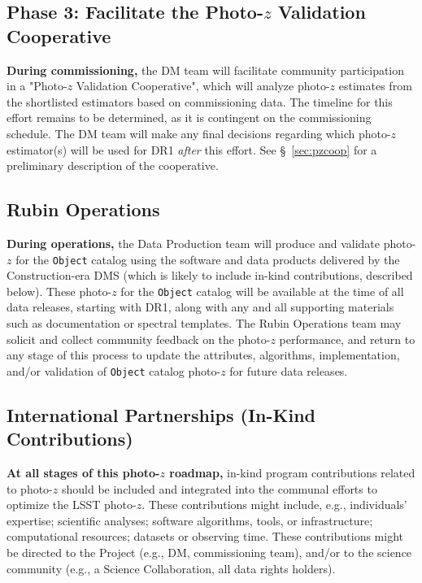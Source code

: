 \documentclass[DM,lsstdraft,toc]{lsstdoc}
\begin{document}
\subsection{Phase 3: Facilitate the Photo-$z$ Validation Cooperative}\label{ssec:time_pzcoop}

{\bf During commissioning,} the DM team will facilitate community participation in a "Photo-$z$ Validation Cooperative", which will analyze photo-$z$ estimates from the shortlisted estimators based on commissioning data.
The timeline for this effort remains to be determined, as it is contingent on the commissioning schedule.
The DM team will make any final decisions regarding which photo-$z$ estimator(s) will be used for DR1 {\it after} this effort. 
See \S~\ref{sec:pzcoop} for a preliminary description of the cooperative.

\subsection{Rubin Operations}\label{ssec:time_ops}

{\bf During operations,} the Data Production team will produce and validate photo-$z$ for the {\tt Object} catalog using the software and data products delivered by the Construction-era DMS (which is likely to include in-kind contributions, described below).
These photo-$z$ for the {\tt Object} catalog will be available at the time of all data releases, starting with DR1, along with any and all supporting materials such as documentation or spectral templates.
The Rubin Operations team may solicit and collect community feedback on the photo-$z$ performance, and return to any stage of this process to update the attributes, algorithms, implementation, and/or validation of {\tt Object} catalog photo-$z$ for future data releases.

\subsection{International Partnerships (In-Kind Contributions)}\label{ssec:time_inkind}

{\bf At all stages of this photo-$z$ roadmap,} in-kind program contributions related to photo-$z$ should be included and integrated into the communal efforts to optimize the LSST photo-$z$. 
These contributions might include, e.g., individuals' expertise; scientific analyses; software algorithms, tools, or infrastructure; computational resources; datasets or observing time.
These contributions might be directed to the Project (e.g., DM, commissioning team), and/or to the science community (e.g., a Science Collaboration, all data rights holders). 
\end{document}
